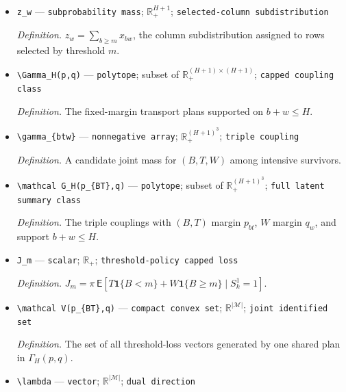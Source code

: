 \documentclass{article}
\begin{document}
\begin{itemize}
  \par\smallskip\noindent\emph{Definition.} A candidate coupling mass \(x_{bw}=\mathsf P(B=b,W=w\mid S_k^1=1)\).
  \item \texttt{z\_\allowbreak{}w} --- \texttt{subprobability mass}; \(\mathbb R_+^{H+1}\); \texttt{selected-\allowbreak{}column subdistribution}
  \par\smallskip\noindent\emph{Definition.} \(z_w=\sum_{b\ge m}x_{bw}\), the column subdistribution assigned to rows selected by threshold \(m\).
  \item \texttt{\textbackslash{}\allowbreak{}Gamma\_\allowbreak{}H(p,\allowbreak{}q)} --- \texttt{polytope}; subset of \(\mathbb R_+^{(H+1)\times(H+1)}\); \texttt{capped coupling class}
  \par\smallskip\noindent\emph{Definition.} The fixed-margin transport plans supported on \(b+w\le H\).
  \item \texttt{\textbackslash{}\allowbreak{}gamma\_\allowbreak{}\{btw\}\allowbreak{}} --- \texttt{nonnegative array}; \(\mathbb R_+^{(H+1)^3}\); \texttt{triple coupling}
  \par\smallskip\noindent\emph{Definition.} A candidate joint mass for \((B,T,W)\) among intensive survivors.
  \item \texttt{\textbackslash{}\allowbreak{}mathcal G\_\allowbreak{}H(p\_\allowbreak{}\{BT\}\allowbreak{},\allowbreak{}q)} --- \texttt{polytope}; subset of \(\mathbb R_+^{(H+1)^3}\); \texttt{full latent summary class}
  \par\smallskip\noindent\emph{Definition.} The triple couplings with \((B,T)\) margin \(p_{bt}\), \(W\) margin \(q_w\), and support \(b+w\le H\).
  \item \texttt{J\_\allowbreak{}m} --- \texttt{scalar}; \(\mathbb R_+\); \texttt{threshold-\allowbreak{}policy capped loss}
  \par\smallskip\noindent\emph{Definition.} \(J_m=\pi\,\mathsf E[T\mathbf 1\{B<m\}+W\mathbf 1\{B\ge m\}\mid S_k^1=1]\).
  \item \texttt{\textbackslash{}\allowbreak{}mathcal V(p\_\allowbreak{}\{BT\}\allowbreak{},\allowbreak{}q)} --- \texttt{compact convex set}; \(\mathbb R^{|\mathcal M|}\); \texttt{joint identified set}
  \par\smallskip\noindent\emph{Definition.} The set of all threshold-loss vectors generated by one shared plan in \(\Gamma_H(p,q)\).
  \item \texttt{\textbackslash{}\allowbreak{}lambda} --- \texttt{vector}; \(\mathbb R^{|\mathcal M|}\); \texttt{dual direction}

\end{itemize}
\end{document}
